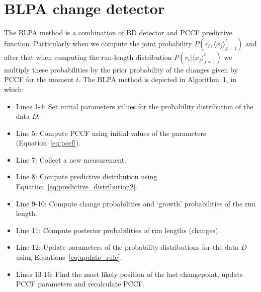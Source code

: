 \section{BLPA change detector}
\label{sec:BLPA}
The BLPA method is a combination of BD detector and PCCF predictive function.
Particularly when we compute the joint probability $P(r_t, \langle x_j \rangle_{j=1}^{t})$
and after that when computing the run-length distribution
$P(r_t | \langle x_j \rangle_{j=1}^{t})$
we multiply these probabilities by the prior probability of the
changes given by PCCF for the moment $t$.
%
The BLPA method is depicted in Algorithm~1, %
in which:
%
\begin{itemize}
    \item Lines 1-4: Set initial parameters values for the probability distribution of the data $D$.

    \item Line 5: Compute PCCF using initial values of the
        parameters (Equation~\ref{eq:pccf}).

    \item Line 7: Collect a new measurement.

    \item Line 8: Compute predictive distribution using Equation~\ref{eq:predictive_distribution2}.

    \item Line 9-10: Compute change probabilities and `growth' probabilities of the run length.

    \item Line 11: Compute posterior probabilities of run lengths (changes).

    \item Line 12: Update parameters of the probability distributions for the data $D$ using Equations~\ref{eq:update_rule}.

    \item Lines 13-16: Find the most likely position of the last changepoint, update PCCF parameters and recalculate PCCF.
\end{itemize}



